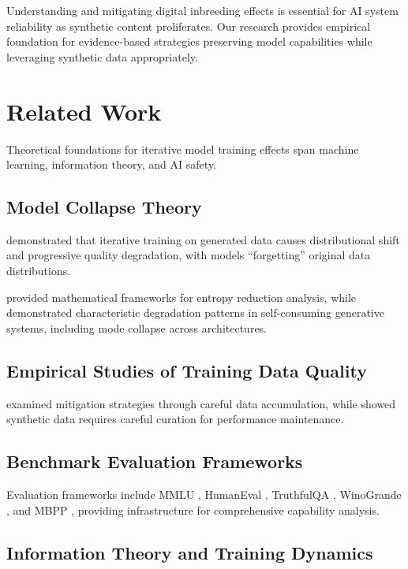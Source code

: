 \documentclass{article}
\begin{document}
Understanding and mitigating digital inbreeding effects is essential for AI system reliability as synthetic content proliferates. Our research provides empirical foundation for evidence-based strategies preserving model capabilities while leveraging synthetic data appropriately.

\section{Related Work}

Theoretical foundations for iterative model training effects span machine learning, information theory, and AI safety.

\subsection{Model Collapse Theory}

\citet{shumailov2023curse} demonstrated that iterative training on generated data causes distributional shift and progressive quality degradation, with models ``forgetting'' original data distributions.

\citet{seddik2024bad} provided mathematical frameworks for entropy reduction analysis, while \citet{alemohammad2023self} demonstrated characteristic degradation patterns in self-consuming generative systems, including mode collapse across architectures.

\subsection{Empirical Studies of Training Data Quality}

\citet{gerstgrasser2024model} examined mitigation strategies through careful data accumulation, while \citet{borji2022pros} showed synthetic data requires careful curation for performance maintenance.

\subsection{Benchmark Evaluation Frameworks}

Evaluation frameworks include MMLU \citep{hendrycks2020measuring}, HumanEval \citep{chen2021evaluating}, TruthfulQA \citep{lin2022truthfulqa}, WinoGrande \citep{sakaguchi2020winogrande}, and MBPP \citep{austin2021program}, providing infrastructure for comprehensive capability analysis.

\subsection{Information Theory and Training Dynamics}
\end{document}
